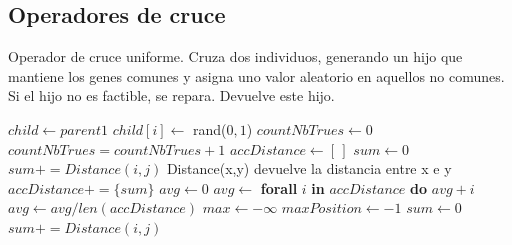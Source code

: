 \subsection{Operadores de cruce}
\begin{algorithm}[H]
    \caption{Operador de cruce uniforme. Cruza dos individuos, generando un hijo que mantiene los genes comunes y asigna uno valor aleatorio en aquellos no comunes. Si el hijo no es factible, se repara. Devuelve este hijo.}
\begin{algorithmic}
    \State $child \leftarrow parent1$
    \State
            \State $child[i] \leftarrow$ rand($0,1$)
        \EndIf
    \EndFor
    \State
    \State $countNbTrues \leftarrow 0$
            \State $countNbTrues = countNbTrues + 1$
        \EndIf
    \EndFor
    \State
        \State $accDistance \leftarrow [ \, ]$
            \State $sum \leftarrow 0$
                    \State $sum += Distance(i,j)$ \Comment Distance(x,y) devuelve la distancia entre x e y
                \EndIf
                \State $accDistance += \{sum\}$
            \EndFor
        \EndFor
        \State
        \State $avg \leftarrow 0$
        \State $avg \leftarrow $ \textbf{forall} $i$ \textbf{in} $accDistance$ \textbf{do} $avg + i$
        \State $avg \leftarrow avg / len(accDistance)$
        \State
        \State $max \leftarrow -\infty$
        \State $maxPosition \leftarrow -1$
                \State $sum \leftarrow 0$
                \State
                    \State $sum += Distance(i,j)$
                \EndFor
{}
\end{algorithmic}
\end{algorithm}


